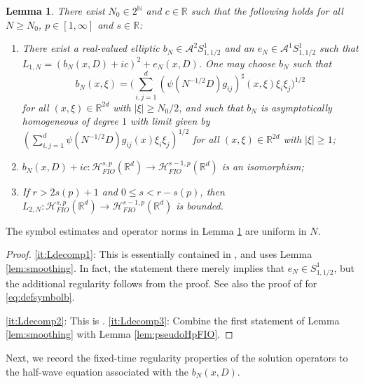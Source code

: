 \documentclass{amsart}
\numberwithin{equation}{section}
\newtheorem{lemma}[theorem]{Lemma}
\theoremstyle{definition}
\newcommand{\R}{\mathbb{R}}
\newcommand{\Rd}{\mathbb{R}^{d}}
\newcommand{\Rn}{\mathbb{R}^{d}}
\newcommand{\N}{\mathbb{N}}
\newcommand {\A}{\mathcal{A}}
\newcommand {\HT}{\mathcal{H}}
\begin{document}
\begin{lemma}\label{lem:Ldecomp}
There exist $N_{0}\in 2^{\N}$ and $c\in\R$ such that the following holds for all $N\geq N_{0}$, $p\in[1,\infty]$ and $s\in\R$:
\begin{enumerate}
\item\label{it:Ldecomp1} There exist a real-valued elliptic $b_{N}\in\A^{2}S^{1}_{1,1/2}$ and an $e_{N}\in \A^{1}S^{1}_{1,1/2}$ such that $L_{1,N}=(b_{N}(x,D)+ic)^{2}+e_{N}(x,D)$. One may choose $b_{N}$ such that
\begin{equation}\label{eq:defsymbolb}
b_{N}(x,\xi)=\Big(\sum_{i,j=1}^{d}(\psi(N^{-1/2}D)g_{ij})^{\sharp}(x,\xi)\xi_{i}\xi_{j}\Big)^{1/2}
\end{equation}
for all $(x,\xi)\in\R^{2d}$ with $|\xi|\geq N_{0}/2$, and such that $b_{N}$ is asymptotically homogeneous of degree $1$ with limit given by $(\sum_{i,j=1}^{d}\psi(N^{-1/2}D)g_{ij}(x)\xi_{i}\xi_{j})^{1/2}$ for all $(x,\xi)\in \R^{2d}$ with $|\xi|\geq 1$; 
\item\label{it:Ldecomp2}
$b_{N}(x,D)+ic:\HT^{s,p}_{FIO}(\Rn)\to \HT^{s-1,p}_{FIO}(\Rd)$ is an isomorphism;
\item\label{it:Ldecomp3} If $r>2s(p)+1$ and $0\leq s< r-s(p)$, then $L_{2,N}:\HT^{s,p}_{FIO}(\Rd)\to \HT^{s-1,p}_{FIO}(\Rd)$ is bounded.
\end{enumerate}
\end{lemma}
The symbol estimates and operator norms in Lemma \ref{lem:Ldecomp} are uniform in $N$.
\begin{proof}
\eqref{it:Ldecomp1}: 
This is essentially contained in \cite[Proposition 5.1]{HassellPortalRozendaal2020}, and uses Lemma \ref{lem:smoothing}. In fact, the statement there merely implies that $e_{N}\in S^{1}_{1,1/2}$, but the additional regularity follows from the proof. 
See also the proof of \cite[Proposition 4.9]{HassellPortalRozendaal2020} for \eqref{eq:defsymbolb}. 

\eqref{it:Ldecomp2}: This is \cite[Lemma 4.10]{HassellRozendaal2023}. 
\eqref{it:Ldecomp3}:  Combine the first statement of %
Lemma \ref{lem:smoothing} with Lemma \ref{lem:pseudoHpFIO}. 
\end{proof}

Next, we record the fixed-time regularity properties of the solution operators to the half-wave equation associated with the $b_{N}(x,D)$.
\end{document}
